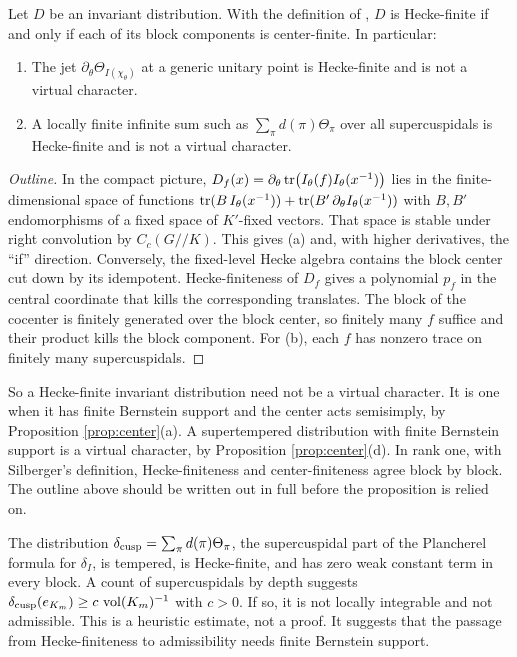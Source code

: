 \begin{proposition}\label{prop:hecke}
Let $D$ be an invariant distribution. With the definition of \cite[Section 1.10]{Si79}, $D$ is Hecke-finite if and only if each of its block components is center-finite. In particular:
\begin{enumerate}[label=(\alph*),leftmargin=*]
\item The jet $\partial_\theta\Theta_{I(\chi_\theta)}$ at a generic unitary point is Hecke-finite and is not a virtual character.
\item A locally finite infinite sum such as $\sum_\pi d(\pi)\Theta_\pi$ over all supercuspidals is Hecke-finite and is not a virtual character.
\end{enumerate}
\end{proposition}
\begin{proof}[Outline]
In the compact picture, $D_f(x)=\partial_\theta\operatorname{tr}\bigl(I_\theta(f)I_\theta(x^{-1})\bigr)$ lies in the finite-dimensional space of functions $\operatorname{tr}(B\,I_\theta(x^{-1}))+\operatorname{tr}(B'\,\partial_\theta I_\theta(x^{-1}))$ with $B,B'$ endomorphisms of a fixed space of $K'$-fixed vectors. That space is stable under right convolution by $C_c(G/\!/K)$. This gives (a) and, with higher derivatives, the ``if'' direction. Conversely, the fixed-level Hecke algebra contains the block center cut down by its idempotent. Hecke-finiteness of $D_f$ gives a polynomial $p_f$ in the central coordinate that kills the corresponding translates. The block of the cocenter is finitely generated over the block center, so finitely many $f$ suffice and their product kills the block component. For (b), each $f$ has nonzero trace on finitely many supercuspidals.
\end{proof}
So a Hecke-finite invariant distribution need not be a virtual character. It is one when it has finite Bernstein support and the center acts semisimply, by Proposition \ref{prop:center}(a). A supertempered distribution with finite Bernstein support is a virtual character, by Proposition \ref{prop:center}(d). In rank one, with Silberger's definition, Hecke-finiteness and center-finiteness agree block by block. The outline above should be written out in full before the proposition is relied on.

\begin{remark}\label{rem:infinite}The distribution $\delta_{\rm cusp}=\sum_\pi d(\pi)\Theta_\pi$, the supercuspidal part of the Plancherel formula for $\delta_I$, is tempered, is Hecke-finite, and has zero weak constant term in every block. A count of supercuspidals by depth suggests $\delta_{\rm cusp}(e_{K_m})\ge c\,\operatorname{vol}(K_m)^{-1}$ with $c>0$. If so, it is not locally integrable and not admissible. This is a heuristic estimate, not a proof. It suggests that the passage from Hecke-finiteness to admissibility needs finite Bernstein support.
\end{remark}

